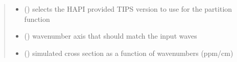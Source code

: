 \documentclass[letterpaper,10pt,english]{sphinxmanual}
\begin{document}
\begin{fulllineitems}
\begin{quote}
\begin{description}
\begin{itemize}
\item {} 
\sphinxAtStartPar
{} (\sphinxstyleliteralemphasis{\sphinxupquote{, }}) \textendash{} selects the HAPI provided TIPS version to use for the partition function

\end{itemize}

\sphinxAtStartPar
\begin{itemize}
\item {} 
\sphinxAtStartPar
{} () \textendash{} wavenumber axis that should match the input waves

\item {} 
\sphinxAtStartPar
{} () \textendash{} simulated cross section as a function of wavenumbers (ppm/cm)

\end{itemize}


\end{description}\end{quote}

\end{fulllineitems}

\end{document}
